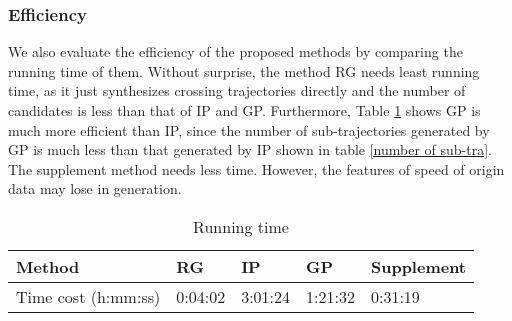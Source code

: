 

\subsubsection{Efficiency} We also evaluate the efficiency of the proposed methods by comparing the running time of them. Without surprise, the method RG needs least running time, as it just synthesizes crossing trajectories directly and the number of candidates is less than that of IP and GP. Furthermore, Table \ref{running time} shows GP is much more efficient than IP, since the number of sub-trajectories generated by GP is much less than that generated by IP shown in table \ref{number of sub-tra}. The supplement method needs less time. However, the features of speed of origin data may lose in generation.
\begin{table}[H]
	\centering
	\caption{Running time}
	\label{running time}
	\begin{small}
		\begin{tabular}{p{3cm}|p{1.5cm}|p{1.5cm}|p{1.5cm}|p{1.7cm}}
			\hline
			Method & RG & IP & GP &Supplement \\ \hline
			Time cost (h:mm:ss) & 0:04:02 & 3:01:24 & 1:21:32 & 0:31:19 \\\hline
		\end{tabular}
	\end{small}
\end{table}
